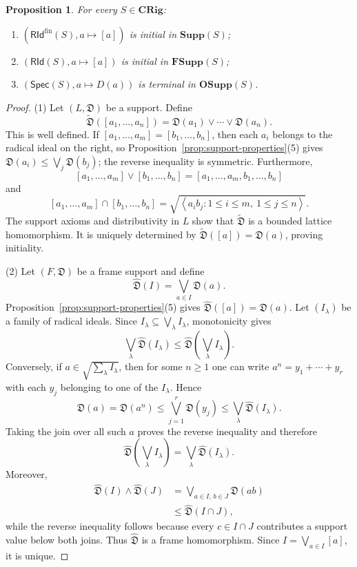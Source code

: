 \documentclass[12pt,leqno]{amsart}
\newcommand{\CRig}{\mathbf{CRig}}
\newcommand{\Supp}{\mathbf{Supp}}
\newcommand{\FSupp}{\mathbf{FSupp}}
\newcommand{\OSupp}{\mathbf{OSupp}}
\newcommand{\Spec}{\mathsf{Spec}}
\newcommand{\RId}{\mathsf{RId}}
\newtheorem{proposition}[theorem]{Proposition}
\theoremstyle{definition}
\numberwithin{equation}{section}
\theoremstyle{remark}
\def\leq{\leqslant}
\begin{document}
\begin{proposition}\label{prop:universal-supports}
For every \(S\in\CRig\):
\begin{enumerate}
\item \((\RId^{\mathrm{fin}}(S),a\mapsto[a])\) is initial in \(\Supp(S)\);
\item \((\RId(S),a\mapsto[a])\) is initial in \(\FSupp(S)\);
\item \((\Spec(S),a\mapsto D(a))\) is terminal in \(\OSupp(S)\).
\end{enumerate}
\end{proposition}

\begin{proof}
(1) Let \((L,\mathfrak D)\) be a support. Define
\[
\widetilde{\mathfrak D}([a_1,\ldots,a_n])
 =\mathfrak D(a_1)\vee\cdots\vee\mathfrak D(a_n).
\]
This is well defined. If
\([a_1,\ldots,a_m]=[b_1,\ldots,b_n]\), then each $a_i$ belongs to the radical ideal on the right, so Proposition~\ref{prop:support-properties}(5) gives
\(\mathfrak D(a_i)\leq\bigvee_j\mathfrak D(b_j)\); the reverse inequality is symmetric. Furthermore,
\[
[a_1,\ldots,a_m]\vee[b_1,\ldots,b_n]
 =[a_1,\ldots,a_m,b_1,\ldots,b_n]
\]
and
\[
[a_1,\ldots,a_m]\cap[b_1,\ldots,b_n]
 =\sqrt{\left\langle
 a_i b_j:1\leq i\leq m,\ 1\leq j\leq n
 \right\rangle}.
\]
The support axioms and distributivity in $L$ show that
\(\widetilde{\mathfrak D}\) is a bounded lattice homomorphism. It is uniquely determined by
\(\widetilde{\mathfrak D}([a])=\mathfrak D(a)\), proving initiality.

(2) Let \((F,\mathfrak D)\) be a frame support and define
\[
\widehat{\mathfrak D}(I)=\bigvee_{a\in I}\mathfrak D(a).
\]
Proposition~\ref{prop:support-properties}(5) gives
\(\widehat{\mathfrak D}([a])=\mathfrak D(a)\). Let \((I_\lambda)\) be a family of radical ideals. Since
\(I_\lambda\subseteq\bigvee_\lambda I_\lambda\), monotonicity gives
\[
\bigvee_\lambda\widehat{\mathfrak D}(I_\lambda)
 \leq
\widehat{\mathfrak D}\left(\bigvee_\lambda I_\lambda\right).
\]
Conversely, if
\(a\in\sqrt{\sum_\lambda I_\lambda}\), then for some $n\geq1$ one can write
\(a^n=y_1+\cdots+y_r\) with each $y_j$ belonging to one of the $I_\lambda$. Hence
\[
\mathfrak D(a)=\mathfrak D(a^n)
 \leq\bigvee_{j=1}^r\mathfrak D(y_j)
 \leq\bigvee_\lambda\widehat{\mathfrak D}(I_\lambda).
\]
Taking the join over all such $a$ proves the reverse inequality and therefore
\[
\widehat{\mathfrak D}\left(\bigvee_\lambda I_\lambda\right)
 =\bigvee_\lambda\widehat{\mathfrak D}(I_\lambda).
\]
Moreover,
\begin{align*}
\widehat{\mathfrak D}(I)\wedge\widehat{\mathfrak D}(J)
 &=\bigvee_{a\in I,\,b\in J}\mathfrak D(ab)\\
 &\leq\widehat{\mathfrak D}(I\cap J),
\end{align*}
while the reverse inequality follows because every \(c\in I\cap J\) contributes a support value below both joins. Thus \(\widehat{\mathfrak D}\) is a frame homomorphism. Since
\(I=\bigvee_{a\in I}[a]\), it is unique.


\end{proof}
\end{document}
